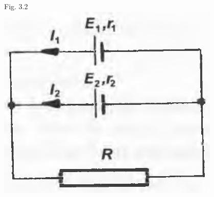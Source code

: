 \documentclass[10pt]{article}
\begin{document}
Fig. 3.2\\
\includegraphics[max width=\textwidth, center]{2025_07_01_5b3ff9fa0d508c8e9f17g-147}
\end{document}
